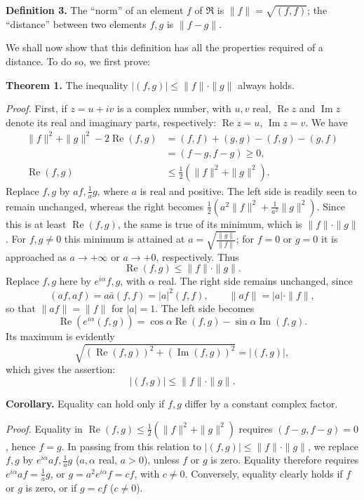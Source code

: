 \documentclass[fontsize=13pt,twoside,openany,headings=normal,parskip=false,bookmarkpackage=false,DIV=calc]{scrbook}
\begin{document}
\leavevmode{}\textbf{Definition 3.}\label{def:II.3} The ``norm'' of an element $f$ of $\mathfrak{R}$ is $\|f\|=\sqrt{(f,f)}$; the ``distance'' between two elements $f,g$ is $\|f-g\|$.

We shall now show that this definition has all the properties required of a distance. To do so, we first prove:

\leavevmode{}\textbf{Theorem 1.}\label{thm:II.1} The inequality $|(f,g)|\leq\|f\|\cdot\|g\|$ always holds.

\emph{Proof.} First, if $z=u+iv$ is a complex number, with $u,v$ real, $\operatorname{Re}z$ and $\operatorname{Im}z$ denote its real and imaginary parts, respectively: $\operatorname{Re}z=u$, $\operatorname{Im}z=v$. We have
\begin{align*}
\|f\|^2+\|g\|^2-2\operatorname{Re}(f,g)
&=(f,f)+(g,g)-(f,g)-(g,f)\\
&=(f-g,f-g)\geq0,\\
\operatorname{Re}(f,g)&\leq\tfrac12(\|f\|^2+\|g\|^2).
\end{align*}
Replace $f,g$ by $af,\frac1a g$, where $a$ is real and positive. The left side is readily seen to remain unchanged, whereas the right becomes $\frac12(a^2\|f\|^2+\frac1{a^2}\|g\|^2)$. Since this is at least $\operatorname{Re}(f,g)$, the same is true of its minimum, which is $\|f\|\cdot\|g\|$. For $f,g\ne0$ this minimum is attained at $a=\sqrt{\frac{\|g\|}{\|f\|}}$; for $f=0$ or $g=0$ it is approached as $a\to+\infty$ or $a\to+0$, respectively.
\hypertarget{origpage-22}{}%
Thus
\[
\operatorname{Re}(f,g)\leq\|f\|\cdot\|g\|.
\]
Replace $f,g$ here by $e^{i\alpha}f,g$, with $\alpha$ real. The right side remains unchanged, since
\[
(af,af)=a\bar a(f,f)=|a|^2(f,f),\qquad
\|af\|=|a|\cdot\|f\|,
\]
so that $\|af\|=\|f\|$ for $|a|=1$. The left side becomes
\[
\operatorname{Re}(e^{i\alpha}(f,g))
=\cos\alpha\operatorname{Re}(f,g)-\sin\alpha\operatorname{Im}(f,g).
\]
Its maximum is evidently
\[
\sqrt{(\operatorname{Re}(f,g))^2+(\operatorname{Im}(f,g))^2}=|(f,g)|,
\]
which gives the assertion:
\[
|(f,g)|\leq\|f\|\cdot\|g\|.
\]

\textbf{Corollary.} Equality can hold only if $f,g$ differ by a constant complex factor.

\emph{Proof.} Equality in $\operatorname{Re}(f,g)\leq\frac12(\|f\|^2+\|g\|^2)$ requires $(f-g,f-g)=0$, hence $f=g$. In passing from this relation to $|(f,g)|\leq\|f\|\cdot\|g\|$, we replace $f,g$ by $e^{i\alpha}af,\frac1a g$ ($a,\alpha$ real, $a>0$), unless $f$ or $g$ is zero. Equality therefore requires $e^{i\alpha}af=\frac1a g$, or $g=a^2e^{i\alpha}f=cf$, with $c\ne0$. Conversely, equality clearly holds if $f$ or $g$ is zero, or if $g=cf$ ($c\ne0$).
\end{document}
